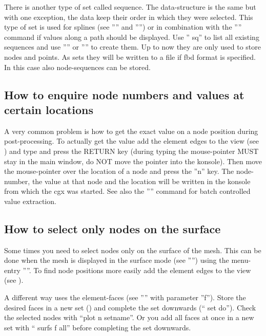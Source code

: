 \documentclass{article}
\begin{document}
\begin{appendix}
There is another type of set called sequence. The data-structure is the same but with one exception, the data keep their order in which they were selected. This type of set is used for splines (see '''' and '''') or in combination with the '''' command if values along a path should be displayed. Use '' sq'' to list all existing sequences and use '''' or '''' to create them. Up to now they are only used to store nodes and points. As sets they will be written to a file if fbd format is specified. In this case also node-sequences can be stored.

\subsection{\label{How to enquire node numbers and values at certain locations}How to enquire node numbers and values at certain locations}
A very common problem is how to get the exact value on a node position during post-processing. To actually get the value add the element edges to the view (see ) and type  and press the RETURN key (during typing the mouse-pointer MUST stay in the main window, do NOT move the pointer into the konsole). Then move the mouse-pointer over the location of a node and press the ''n'' key. The node-number, the value at that node and the location will be written in the konsole from which the cgx was started. See also the '''' command for batch controlled value extraction.

\subsection{\label{How to select only nodes on the surface}How to select only nodes on the surface}
Some times you need to select nodes only on the surface of the mesh. This can be done when the mesh is displayed in the surface mode (see '''') using the menu-entry ''''. To find node positions more easily add the element edges to the view (see ).

A different way uses the element-faces (see '''' with parameter ''f''). Store the desired faces in a new set () and complete the set downwards (`` set do''). Check the selected nodes with ``plot n setname''. Or you add all faces at once in a new set with `` surfs f all'' before completing the set downwards.


\end{appendix}
\end{document}

